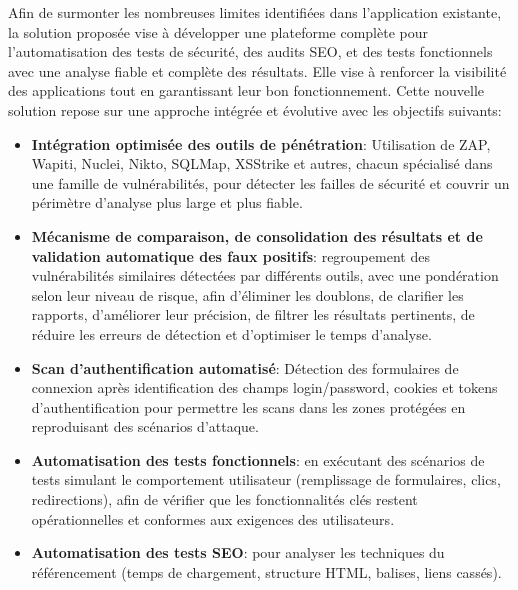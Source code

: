 Afin de surmonter les nombreuses limites identifiées dans l’application existante, la solution proposée vise à développer une plateforme complète pour l’automatisation des tests de sécurité, des audits SEO, et des tests fonctionnels avec une analyse fiable et complète des résultats. Elle vise à renforcer la visibilité des applications tout en garantissant leur bon fonctionnement. Cette nouvelle solution repose sur une approche intégrée et évolutive avec les objectifs suivants:
\begin{itemize}[label=$\bullet$,left=0.09cm]
    \item \textbf{Intégration optimisée des outils de pénétration}: Utilisation de ZAP\cite{zap}, Wapiti\cite{wapiti}, Nuclei\cite{nuclei}, Nikto\cite{nikto}, SQLMap\cite{sqlmap}, XSStrike\cite{xsstrike} et autres, chacun spécialisé dans une famille de vulnérabilités, pour détecter les failles de sécurité et couvrir un périmètre d’analyse plus large et plus fiable.
    
    \item \textbf{Mécanisme de comparaison, de consolidation des résultats et de validation automatique des faux positifs}: regroupement des vulnérabilités similaires détectées par différents outils, avec une pondération selon leur niveau de risque, afin d’éliminer les doublons, de clarifier les rapports, d’améliorer leur précision, de filtrer les résultats pertinents, de réduire les erreurs de détection et d’optimiser le temps d’analyse.

    \item \textbf{Scan d’authentification automatisé}: Détection des formulaires de connexion après identification des champs login/password, cookies et tokens d’authentification pour permettre les scans dans les zones protégées en reproduisant des scénarios d’attaque.
    
    \item \textbf{Automatisation des tests fonctionnels}: en exécutant des scénarios de tests simulant le comportement utilisateur (remplissage de formulaires, clics, redirections), afin de vérifier que les fonctionnalités clés restent opérationnelles et conformes aux exigences des utilisateurs.
    
    \item \textbf{Automatisation des tests SEO}: pour analyser les techniques du référencement (temps de chargement, structure HTML, balises, liens cassés).
    

\end{itemize}
